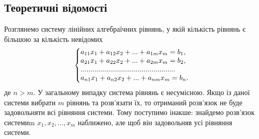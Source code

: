 \documentclass{article}
\begin{document}
\begin{large}
		\section*{Теоретичні відомості}
		Розглянемо систему лінійних алгебраїчних рівнянь, у якій кількість
		рівнянь є більшою за кількість невідомих
		\begin{gather}
			\left\{\begin{array}{@{}l@{}}
				a_{11}x_1 + a_{12}x_2 + ... + a_{1m}x_m = b_{1},\\\nonumber
				a_{21}x_1 + a_{22}x_2 + ... + a_{2m}x_m = b_{2},\\\nonumber
				................................................\\\nonumber
				a_{n1}x_1 + a_{n2}x_2 + ... + a_{nm}x_m = b_{n}.\nonumber
			\end{array}\right.\,
		\end{gather}
		де $n>m$.
		У загальному випадку система рівнянь є несумісною. Якщо із даної системи вибрати $m$ рівнянь та розв’язати їх, то отриманий розв’язок не буде задовольняти всі рівняння системи. Тому поступимо інакше: знайдемо розв’язок системиm $x_1, x_2,...,x_m$ наближено, але щоб він задовольняв усі рівняння системи.
		

\end{large}
\end{document}
